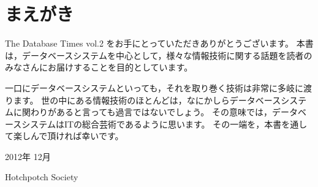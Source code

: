 
\chapter*{まえがき}
\thispagestyle{fronthead}

The Database Times vol.2 をお手にとっていただきありがとうございます。
本書は，データベースシステムを中心として，様々な情報技術に関する話題を読者のみなさんにお届けすることを目的としています。

一口にデータベースシステムといっても，それを取り巻く技術は非常に多岐に渡ります。
世の中にある情報技術のほとんどは，なにかしらデータベースシステムに関わりがあると言っても過言ではないでしょう。
その意味では，データベースシステムはITの総合芸術であるように思います。
その一端を，本書を通して楽しんで頂ければ幸いです。

\begin{flushright}
 2012年 12月

Hotchpotch Society
\end{flushright}
